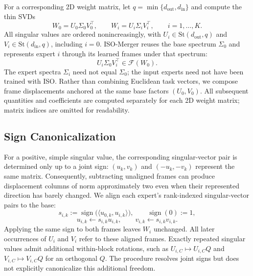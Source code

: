 \documentclass[11pt, a4paper]{utda}
\theoremstyle{plain}
\theoremstyle{definition}
\theoremstyle{remark}
\begin{document}
For a corresponding 2D weight matrix, let
$q=\min\{d_{\mathrm{out}},d_{\mathrm{in}}\}$ and compute the thin SVDs
\begin{equation}
\label{eq:app_iso_merger_setup}
    W_0=U_0\Sigma_0V_0^\top,
    \qquad
    W_i=U_i\Sigma_iV_i^\top,
    \qquad i=1,\ldots,K.
\end{equation}
All singular values are ordered nonincreasingly, with
$U_i\in\mathrm{St}(d_{\mathrm{out}},q)$ and
$V_i\in\mathrm{St}(d_{\mathrm{in}},q)$, including $i=0$.
ISO-Merger reuses the base spectrum $\Sigma_0$ and represents expert $i$
through its learned frames under that spectrum:
\begin{equation}
\label{eq:app_iso_merger_expert_representative}
    U_i\Sigma_0V_i^\top\in\mathcal F(W_0).
\end{equation}
The expert spectra $\Sigma_i$ need not equal $\Sigma_0$; the input experts
need not have been trained with ISO.
Rather than combining Euclidean task vectors, we compose frame
displacements anchored at the same base factors $(U_0,V_0)$.
All subsequent quantities and coefficients are computed separately
for each 2D weight matrix; matrix indices are omitted for readability.

\subsection{Sign Canonicalization}
\label{app:gauge}

For a positive, simple singular value, the corresponding singular-vector
pair is determined only up to a joint sign:
$(u_k,v_k)$ and $(-u_k,-v_k)$ represent the same matrix.
Consequently, subtracting unaligned frames can produce displacement
columns of norm approximately two even when their represented direction
has barely changed.
We align each expert's rank-indexed singular-vector pairs to the base:
\begin{equation}
\label{eq:app_iso_merger_signs}
    s_{i,k}:=\operatorname{sign}
        \bigl(\langle u_{0,k},u_{i,k}\rangle\bigr),
    \qquad \operatorname{sign}(0):=1,
\end{equation}
\begin{equation}
\label{eq:app_iso_merger_sign_alignment}
    u_{i,k}\leftarrow s_{i,k}u_{i,k},
    \qquad
    v_{i,k}\leftarrow s_{i,k}v_{i,k}.
\end{equation}
Applying the same sign to both frames leaves $W_i$ unchanged.
All later occurrences of $U_i$ and $V_i$ refer to these aligned frames.
Exactly repeated singular values admit additional within-block
rotations, such as $U_{i,C}\mapsto U_{i,C}Q$ and
$V_{i,C}\mapsto V_{i,C}Q$ for an orthogonal $Q$.
The procedure resolves joint signs but does not explicitly canonicalize
this additional freedom.
\end{document}
